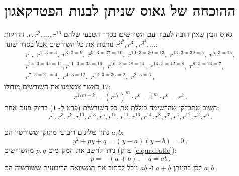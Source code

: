 \section{ההוכחה של גאוס 
שניתן לבנות הפטדקאגון}
\label{s.gauss}

גאוס
הבין שאין חובה לעבוד עם השורשים בסדר הטבעי שלהם
$r,r^2,\ldots,r^{16}$. 
החזקות
$r^{3^0}, r^{3^1}, r^{3^2}, \ldots$
נותנות את כל השורשים אבל בסדר שונה:
\[
\renewcommand{\arraystretch}{1.1}
\begin{array}{l}
r^1, \;r^{1\cdot 3 =3},\; r^{3\cdot 3=9},\; r^{9\cdot 3=27=10},\; r^{10\cdot 3=30=13},\; r^{13\cdot 3=39=5},\; r^{5\cdot 3=15},\\ r^{15\cdot 3=45=11},
r^{11\cdot 3 =33=16}, \;r^{16\cdot 3=48=14},\; r^{14\cdot 3=42=8},\; r^{8\cdot 3=24=7},\\r^{7\cdot 3=21=4},\; r^{4\cdot 3=12},\; r^{12\cdot 3=36=2},\; r^{2\cdot 3=6}\,,
\end{array}
\]
כאשר צמצמנו את השורשים מודולו
$17$:
\[
r^{17m+k}=(r^{17})^m\cdot r^k=1^m\cdot r^k=r^k\,.
\]
חשוב שתבדקו שהרשימה כוללת את כל השורשים  (פרט ל-%
$1$)
בדיוק פעם אחת:
\begin{equation}\label{eq.roots}
r^1, r^3, r^9, r^{10}, r^{13}, r^5, r^{15}, r^{11}, r^{16}, r^{14}, r^8, r^7, r^4, r^{12}, r^2, r^6\,.
\end{equation}

נתון פולינום ריבועי מתוקן ששורשיו הם
$a,b$:
\[
y^2+py+q=(y-a)(y-b)=0\,,
\]
ניתן לחשב את המקדמים
$p,	q$
מהשורשים
(פרק%
\ref{c.quadratic}):
\[
p=-(a+b)\,,\quad q=ab\,.
\]
לכן בהינתן
$a+b$
ו-%
$ab$
נוכל לכתוב את המשוואה הריבועית ששורשיה הם
$a,b$.

